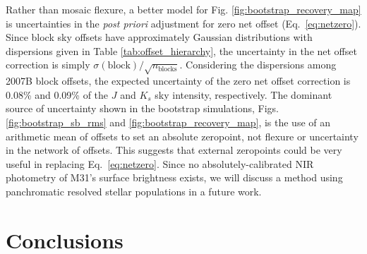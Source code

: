 \documentclass[iop]{emulateapj}
\begin{document}
Rather than mosaic flexure, a better model for Fig. \ref{fig:bootstrap_recovery_map} is uncertainties in the \textit{post priori} adjustment for zero net offset (Eq.~\ref{eq:netzero}). Since block sky offsets have approximately Gaussian distributions with dispersions given in Table \ref{tab:offset_hierarchy}, the uncertainty in the net offset correction is simply $\sigma(\mathrm{block})/\sqrt{n_\mathrm{blocks}}$. Considering the dispersions among 2007B block offsets, the expected uncertainty of the zero net offset correction is 0.08\% and 0.09\% of the $J$ and $K_s$ sky intensity, respectively. The dominant source of uncertainty shown in the bootstrap simulations, Figs. \ref{fig:bootstrap_sb_rms} and \ref{fig:bootstrap_recovery_map}, is the use of an arithmetic mean of offsets to set an absolute zeropoint, not flexure or uncertainty in the network of offsets. This suggests that external zeropoints could be very useful in replacing Eq.~\ref{eq:netzero}. Since no absolutely-calibrated NIR photometry of M31's surface brightness exists, we will discuss a method using panchromatic resolved stellar populations in a future work.

\section{Conclusions}
\label{sec:conclusions}


\end{document}
